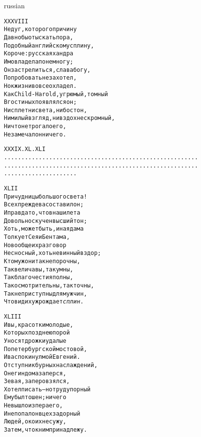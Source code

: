 \documentclass[12pt,twocolumn]{article}
\begin{document}
\begin{center}
\begin{otherlanguage*}{russian}
\begin{minipage}[t]{\dimexpr 0.5\textwidth -\tabcolsep-.5pt}
\begin{alltt}\normalfont\centering
XXXVIII
Недуг, которого причину
Давно бы отыскать пора,
Подобный английскому сплину,
Короче: русская хандра
Им овладела понемногу;
Он застрелиться, слава богу,
Попробовать не захотел,
Но к жизни вовсе охладел.
Как Child-Harold, угрюмый, томный
В гостиных появлялся он;
Ни сплетни света, ни бостон,
Ни милый взгляд, ни вздох нескромный,
Ничто не трогало его,
Не замечал он ничего.
\end{alltt}
\end{minipage}
\clearpage

\begin{minipage}[t]{\dimexpr 0.5\textwidth -\tabcolsep-.5pt}
\begin{alltt}\normalfont\centering
XXXIX. XL. XLI
........................................................
........................................................
.....................
\end{alltt}
\end{minipage}

\vspace{4in}
\begin{minipage}[t]{\dimexpr 0.5\textwidth -\tabcolsep-.5pt}
\begin{alltt}\normalfont\centering
XLII
Причудницы большого света!
Всех прежде вас оставил он;
И правда то, что в наши лета
Довольно скучен высший тон;
Хоть, может быть, иная дама
Толкует Сея и Бентама,
Но вообще их разговор
Несносный, хоть невинный вздор;
К тому ж они так непорочны,
Так величавы, так умны,
Так благочестия полны,
Так осмотрительны, так точны,
Так неприступны для мужчин,
Что вид их уж рождает \textit{сплин}.
\end{alltt}
\end{minipage}
\clearpage

\begin{minipage}[t]{\dimexpr 0.5\textwidth -\tabcolsep-.5pt}
\begin{alltt}\normalfont\centering
XLIII
И вы, красотки молодые,
Которых позднею порой
Уносят дрожки удалые
По петербургской мостовой,
И вас покинул мой Евгений.
Отступник бурных наслаждений,
Онегин дома заперся,
Зевая, за перо взялся,
Хотел писать — но труд упорный
Ему был тошен; ничего
Не вышло из пера его,
И не попал он в цех задорный
Людей, о коих не сужу,
Затем, что к ним принадлежу.
\end{alltt}
\end{minipage}


\end{otherlanguage*}
\end{center}
\end{document}
